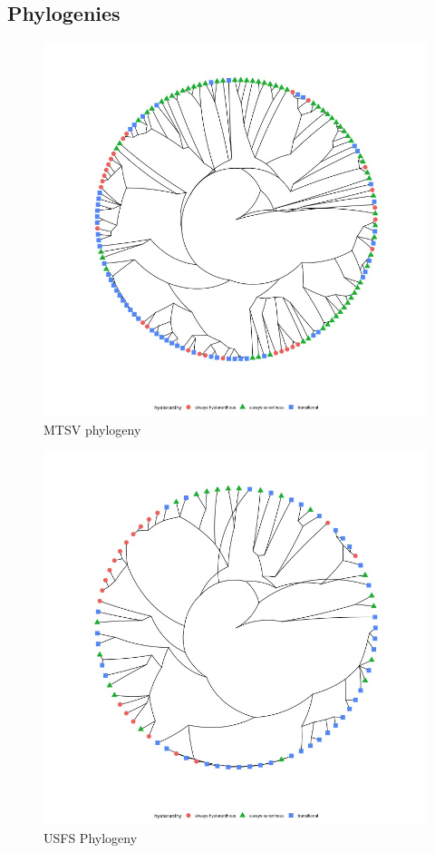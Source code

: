 \documentclass[12pt]{article}\usepackage[]{graphicx}\usepackage[]{color}
\begin{document}
\subsection*{Phylogenies}
 \begin{figure}[h!]
    \centering
    \includegraphics[height=.8\textheight]{..//figure/michtreeplot.jpeg}
    \caption{MTSV phylogeny}
    \label{fig:Figure S3}
    \end{figure}
    
     \begin{figure}
    \centering
    \includegraphics[height=.8\textheight]{..//figure/silvtreeplot.jpeg}
    \caption{USFS Phylogeny}
    \label{fig:Figure S4}
    \end{figure}
    
\end{document}

